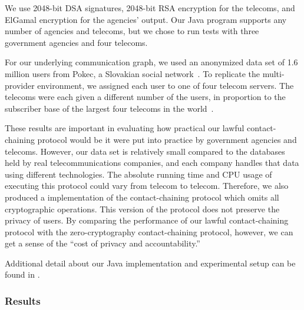 We use 2048-bit DSA signatures, 2048-bit RSA encryption for the telecoms, 
and ElGamal encryption for the agencies' output. 
Our Java program supports any number of agencies and telecoms, but we chose to run tests with three government agencies and four telecoms. 

For our underlying communication graph, we used an a\-no\-ny\-mized data set of 1.6 million users from Pokec, a Slovakian social network~\cite{snapnets}. To replicate the multi-provider environment, we assigned each user to one of four telecom servers. The telecoms were each given a different number of the users, in proportion to the subscriber base of the largest four telecoms in the world~\cite{mobiforge}.

These results are important in evaluating how practical our lawful contact-chaining protocol would be it were put into practice by government agencies and telecoms. However, our data set is relatively small compared to the data\-ba\-ses held by real telecommunications companies, and each company handles that data using different technologies. The absolute running time and CPU usage of executing this protocol could vary from telecom to telecom. Therefore, we also produced a implementation of the contact-chaining protocol which omits all cryptographic operations. This version of the protocol does not preserve the privacy of users. By comparing the performance of our lawful contact-chaining protocol with the zero-cryptography contact-chaining protocol, however, we can get a sense of the ``cost of privacy and accountability.'' 

Additional detail about our Java implementation and experimental setup can be found in \cite[Section 4.3]{sff-TR}.

\subsubsection{Results}

